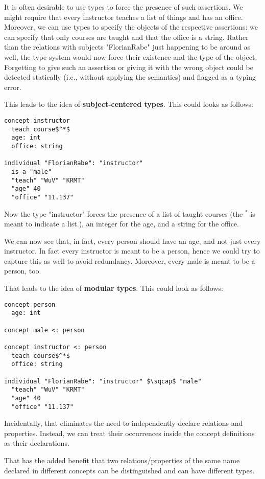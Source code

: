 It is often desirable to use types to force the presence of such assertions.
We might require that every instructor teaches a list of things and has an office.
Moreover, we can use types to specify the objects of the respective assertions: we can specify that only courses are taught and that the office is a string.
Rather than the relations with subjects "FlorianRabe" just happening to be around as well, the type system would now force their existence and the type of the object.
Forgetting to give such an assertion or giving it with the wrong object could be detected statically (i.e., without applying the semantics) and flagged as a typing error.

This leads to the idea of \textbf{subject-centered types}.
This could looks as follows:
\begin{lstlisting}
concept instructor
  teach course$^*$
  age: int
  office: string

individual "FlorianRabe": "instructor"
  is-a "male"
  "teach" "WuV" "KRMT"
  "age" 40
  "office" "11.137"
\end{lstlisting}
Now the type "instructor" forces the presence of a list of taught courses (the $^*$ is meant to indicate a list.), an integer for the age, and a string for the office.

We can now see that, in fact, every person should have an age, and not just every instructor.
In fact every instructor is meant to be a person, hence we could try to capture this as well to avoid redundancy.
Moreover, every male is meant to be a person, too.

That leads to the idea of \textbf{modular types}.
This could look as follows:

\begin{lstlisting}
concept person
  age: int
  
concept male <: person

concept instructor <: person
  teach course$^*$
  office: string

individual "FlorianRabe": "instructor" $\sqcap$ "male"
  "teach" "WuV" "KRMT"
  "age" 40
  "office" "11.137"
\end{lstlisting}

Incidentally, that eliminates the need to independently declare relations and properties.
Instead, we can treat their occurrences inside the concept definitions as their declarations.

That has the added benefit that two relations/properties of the same name declared in different concepts can be distinguished and can have different types.

